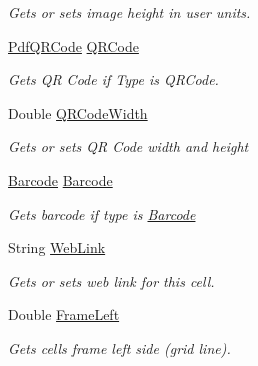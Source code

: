 \begin{DoxyCompactItemize}
\begin{DoxyCompactList}\small\item\em Gets or sets image height in user units. \end{DoxyCompactList}\item 
\hyperlink{class_pdf_file_writer_1_1_pdf_q_r_code}{Pdf\+Q\+R\+Code} \hyperlink{class_pdf_file_writer_1_1_pdf_table_cell_a940f638dbb778196bc36633e9e64af26}{Q\+R\+Code}
\begin{DoxyCompactList}\small\item\em Gets QR Code if Type is Q\+R\+Code. \end{DoxyCompactList}\item 
Double \hyperlink{class_pdf_file_writer_1_1_pdf_table_cell_aa61ba83535799b3b3fad3705becc5727}{Q\+R\+Code\+Width}
\begin{DoxyCompactList}\small\item\em Gets or sets QR Code width and height \end{DoxyCompactList}\item 
\hyperlink{class_pdf_file_writer_1_1_barcode}{Barcode} \hyperlink{class_pdf_file_writer_1_1_pdf_table_cell_a2666d0c7e3a91dfc08d3869746af2917}{Barcode}
\begin{DoxyCompactList}\small\item\em Gets barcode if type is \hyperlink{class_pdf_file_writer_1_1_barcode}{Barcode} \end{DoxyCompactList}\item 
String \hyperlink{class_pdf_file_writer_1_1_pdf_table_cell_a8c12f3569a690ac6c1934311fcc9cb96}{Web\+Link}
\begin{DoxyCompactList}\small\item\em Gets or sets web link for this cell. \end{DoxyCompactList}\item 
Double \hyperlink{class_pdf_file_writer_1_1_pdf_table_cell_a1b7a9752e2f996c520641d5649ad4026}{Frame\+Left}
\begin{DoxyCompactList}\small\item\em Gets cell\textquotesingle{}s frame left side (grid line). \end{DoxyCompactList}\item 

\end{DoxyCompactItemize}
